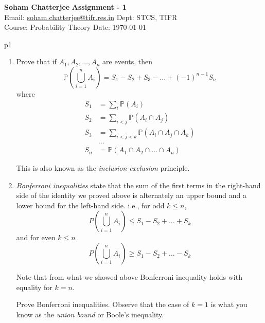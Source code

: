 \documentclass[a4paper, 11pt]{article}
\begin{document}
	
	
	\textsf{\noindent \large\textbf{Soham Chatterjee} \hfill \textbf{Assignment - 1}\\
		Email: \href{soham.chatterjee@tifr.res.in}{soham.chatterjee@tifr.res.in} \hfill Dept: STCS, TIFR\\
		\normalsize Course: Probability Theory \hfill Date: \today}
	
	
\begin{problem}{%
	}{p1%
}
\begin{enumerate}[label=(\alph*)]
	\item Prove that if $A_1, A_2, \ldots, A_n$ are events, then
	$$
	\mathbb{P}\left(\bigcup_{i=1}^n A_i\right)=S_1-S_2+S_3-\ldots+(-1)^{n-1} S_n
	$$
	where
	$$
	\begin{aligned}
		S_1 & =\sum_i \mathbb{P}\left(A_i\right) \\
		S_2 & =\sum_{i<j} \mathbb{P}\left(A_i \cap A_j\right) \\
		S_3 & =\sum_{i<j<k} \mathbb{P}\left(A_i \cap A_j \cap A_k\right) \\
		& \ldots \\
		S_n & =\mathbb{P}\left(A_1 \cap A_2 \cap \ldots \cap A_n\right)
	\end{aligned}
	$$
	
	This is also known as the \textit{inclusion-exclusion} principle.
	\item  \textit{Bonferroni inequalities} state that the sum of the first terms in the right-hand side of the identity we proved above is alternately an upper bound and a lower bound for the left-hand side. i.e., for odd $k \leq n$,
	$$
	P\left(\bigcup_{i=1}^n A_i\right) \leq S_1-S_2+\ldots+S_k
	$$
	and for even $k \leq n$
	$$
	P\left(\bigcup_{i=1}^n A_i\right) \geq S_1-S_2+\ldots-S_k
	$$
	
	Note that from what we showed above Bonferroni inequality holds with equality for $k=n$.
	
	Prove Bonferroni inequalities. Observe that the case of $k=1$ is what you know as the \textit{union bound} or Boole's inequality.
\end{enumerate}
\end{problem}
\solve{	
		\begin{enumerate}[label=(\alph*)]
			\item 
		\end{enumerate}
}
\end{document}

